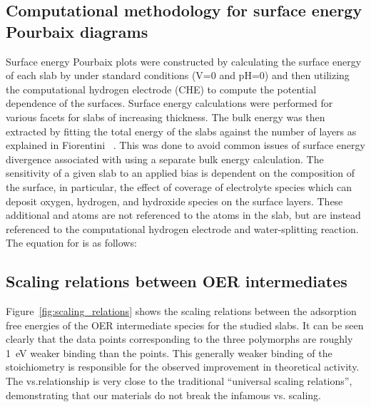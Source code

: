 \subsection{Computational methodology for surface energy Pourbaix diagrams}
%
%
Surface energy Pourbaix plots were constructed by calculating the surface energy of each slab by under standard conditions (\si{\volt}\num{=0} and pH\num{=0}) and then utilizing the computational hydrogen electrode (CHE) to compute the potential dependence of the surfaces.
%
Surface energy calculations were performed for various facets for slabs of increasing thickness.
%
The bulk energy was then extracted by fitting the total energy of the slabs against the number of layers as explained in Fiorentini ~\cite{Boettger1998}.
%
This was done to avoid common issues of surface energy divergence associated with using a separate bulk energy calculation.
%
The sensitivity of a given slab to an applied bias is dependent on the composition of the surface,
in particular, the effect of coverage of electrolyte species which can deposit oxygen, hydrogen, and hydroxide species on the surface layers.
%
These additional  and  atoms are not referenced to the atoms in the slab, but are instead referenced to the computational hydrogen electrode and water-splitting reaction.
%
The equation for is as follows:


\subsection{Scaling relations between OER intermediates}
%


%
%
Figure~\ref{fig:scaling_relations} shows the scaling relations between the adsorption free energies of the OER intermediate species for the studied \IrOx slabs.
%
It can be seen clearly that the data points corresponding to the three \IrOthree polymorphs are roughly \SI{1}{\electronvolt} weaker binding than the \rIrOtwo points.
%
This generally weaker binding of the \IrOthree stoichiometry is responsible for the observed improvement in theoretical activity.
%
The \DGOOH vs.\DGOH relationship is very close to the traditional ``universal scaling relations'', demonstrating that our materials do not break the infamous \DGOOH vs. \DGOH scaling.

